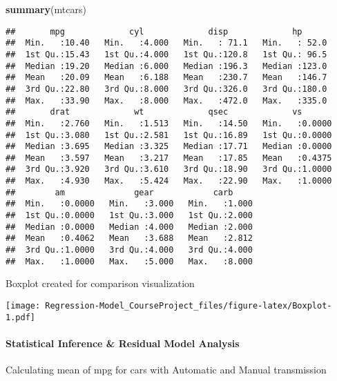 \documentclass[
]{article}
\newenvironment{Shaded}{\begin{snugshade}}{\end{snugshade}}
\newcommand{\AttributeTok}[1]{\textcolor[rgb]{0.13,0.29,0.53}{#1}}
\newcommand{\FunctionTok}[1]{\textcolor[rgb]{0.13,0.29,0.53}{\textbf{#1}}}
\newcommand{\NormalTok}[1]{#1}
\newcommand{\SpecialCharTok}[1]{\textcolor[rgb]{0.81,0.36,0.00}{\textbf{#1}}}
\begin{document}
\begin{Shaded}
\begin{Highlighting}[]
\FunctionTok{summary}\NormalTok{(mtcars)}
\end{Highlighting}
\end{Shaded}

\begin{verbatim}
##       mpg             cyl             disp             hp       
##  Min.   :10.40   Min.   :4.000   Min.   : 71.1   Min.   : 52.0  
##  1st Qu.:15.43   1st Qu.:4.000   1st Qu.:120.8   1st Qu.: 96.5  
##  Median :19.20   Median :6.000   Median :196.3   Median :123.0  
##  Mean   :20.09   Mean   :6.188   Mean   :230.7   Mean   :146.7  
##  3rd Qu.:22.80   3rd Qu.:8.000   3rd Qu.:326.0   3rd Qu.:180.0  
##  Max.   :33.90   Max.   :8.000   Max.   :472.0   Max.   :335.0  
##       drat             wt             qsec             vs        
##  Min.   :2.760   Min.   :1.513   Min.   :14.50   Min.   :0.0000  
##  1st Qu.:3.080   1st Qu.:2.581   1st Qu.:16.89   1st Qu.:0.0000  
##  Median :3.695   Median :3.325   Median :17.71   Median :0.0000  
##  Mean   :3.597   Mean   :3.217   Mean   :17.85   Mean   :0.4375  
##  3rd Qu.:3.920   3rd Qu.:3.610   3rd Qu.:18.90   3rd Qu.:1.0000  
##  Max.   :4.930   Max.   :5.424   Max.   :22.90   Max.   :1.0000  
##        am              gear            carb      
##  Min.   :0.0000   Min.   :3.000   Min.   :1.000  
##  1st Qu.:0.0000   1st Qu.:3.000   1st Qu.:2.000  
##  Median :0.0000   Median :4.000   Median :2.000  
##  Mean   :0.4062   Mean   :3.688   Mean   :2.812  
##  3rd Qu.:1.0000   3rd Qu.:4.000   3rd Qu.:4.000  
##  Max.   :1.0000   Max.   :5.000   Max.   :8.000
\end{verbatim}

Boxplot created for comparison visualization

\texttt{[image: Regression-Model\_CourseProject\_files/figure-latex/Boxplot-1.pdf]}

\hypertarget{statistical-inference-residual-model-analysis}{%
\paragraph{Statistical Inference \& Residual Model
Analysis}\label{statistical-inference-residual-model-analysis}}

Calculating mean of mpg for cars with Automatic and Manual transmission

\begin{Shaded}
\end{Shaded}
\end{document}
